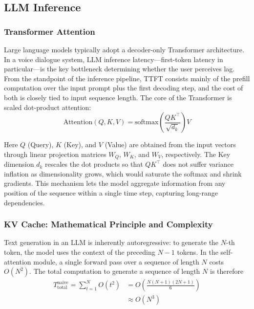 \documentclass[conference]{IEEEtran}
\begin{document}
\subsection{LLM Inference}

\subsubsection{Transformer Attention}

Large language models typically adopt a decoder-only Transformer architecture. In a voice dialogue system, LLM inference latency---first-token latency in particular---is the key bottleneck determining whether the user perceives lag. From the standpoint of the inference pipeline, TTFT consists mainly of the prefill computation over the input prompt plus the first decoding step, and the cost of both is closely tied to input sequence length. The core of the Transformer is scaled dot-product attention:
\begin{equation}
\mathrm{Attention}(Q,K,V)=\mathrm{softmax}\!\left(\frac{QK^{\top}}{\sqrt{d_k}}\right)V
\label{eq:attention}
\end{equation}

Here $Q$ (Query), $K$ (Key), and $V$ (Value) are obtained from the input vectors through linear projection matrices $W_Q$, $W_K$, and $W_V$, respectively. The Key dimension $d_k$ rescales the dot products so that $QK^{\top}$ does not suffer variance inflation as dimensionality grows, which would saturate the softmax and shrink gradients. This mechanism lets the model aggregate information from any position of the sequence within a single time step, capturing long-range dependencies.

\subsubsection{KV Cache: Mathematical Principle and Complexity}

Text generation in an LLM is inherently autoregressive: to generate the $N$-th token, the model uses the context of the preceding $N-1$ tokens. In the self-attention module, a single forward pass over a sequence of length $N$ costs $O(N^{2})$. The total computation to generate a sequence of length $N$ is therefore
\begin{align}
T_{\mathrm{total}}^{\mathrm{naive}}=\sum_{t=1}^{N}O(t^{2})&=O\!\left(\frac{N(N+1)(2N+1)}{6}\right) \nonumber\\
&\approx O(N^{3})
\label{eq:naive}
\end{align}
\end{document}
